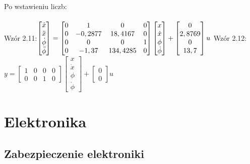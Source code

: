 \documentclass[a4paper,12pt,twoside,openany]{report}
\begin{document}
\noindent Po wstawieniu liczb:\\
\\Wzór 2.11:$
     \begin{bmatrix}
       \dot{x} \\
       \ddot{x} \\
       \dot{\phi} \\
       \ddot{\phi}
     \end{bmatrix}
     =
     \begin{bmatrix}
       0 & 1 & 0 & 0          \\
       0 & -0,2877 & 18,4167 & 0 \\
       0 & 0 & 0 & 1 \\
       0 & -1,37 & 134,4285 & 0 
     \end{bmatrix}
     \begin{bmatrix}
       x \\
       \dot{x} \\
       \phi \\
       \dot{\phi}
     \end{bmatrix}
     +
     \begin{bmatrix}
       0 \\
       2,8769 \\
       0 \\
       13,7
     \end{bmatrix}
     u\\$
Wzór 2.12:
$y=
     \begin{bmatrix}
       1 & 0 & 0 & 0 \\
       0 & 0 & 1 & 0 
     \end{bmatrix}
     \begin{bmatrix}
       x \\
       \dot{x} \\
       \phi \\
       \dot{\phi}
     \end{bmatrix}
     +
     \begin{bmatrix}
       0 \\
       0 
     \end{bmatrix}
     u
$


\chapter{Elektronika}


\section{Zabezpieczenie elektroniki}
\end{document}
